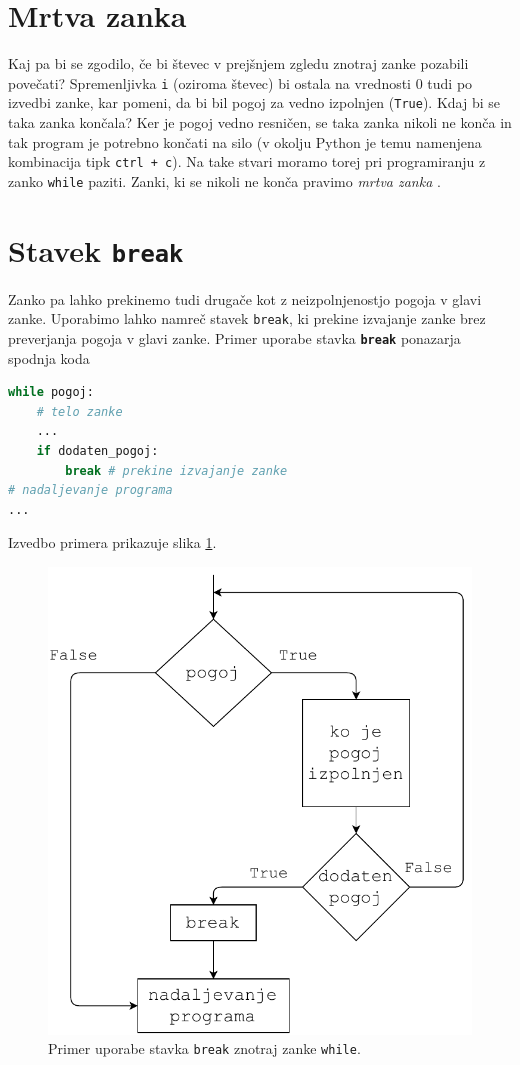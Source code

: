 \section{Mrtva zanka}

Kaj pa bi se zgodilo, če bi števec v prejšnjem zgledu znotraj zanke pozabili povečati? Spremenljivka \texttt{i} (oziroma števec) bi ostala na vrednosti 0 tudi po izvedbi zanke, kar pomeni, da bi bil pogoj za vedno izpolnjen (\texttt{True}). Kdaj bi se taka zanka končala? Ker je pogoj vedno resničen, se taka zanka nikoli ne konča in tak program je potrebno končati na silo (v okolju Python je temu namenjena kombinacija tipk \texttt{ctrl + c}). Na take stvari moramo torej pri programiranju z zanko \texttt{while} paziti. Zanki, ki se nikoli ne konča pravimo \emph{mrtva zanka} .

\section{Stavek \texttt{break}}
Zanko pa lahko prekinemo tudi drugače kot z neizpolnjenostjo pogoja v glavi zanke. Uporabimo lahko namreč stavek \texttt{break}, ki prekine izvajanje zanke brez preverjanja pogoja v glavi zanke. Primer uporabe stavka \texttt\textbf{break} ponazarja spodnja koda
\begin{lstlisting}[language=Python]
while pogoj:
    # telo zanke
    ...
    if dodaten_pogoj: 
        break # prekine izvajanje zanke
# nadaljevanje programa
...
\end{lstlisting}
Izvedbo primera prikazuje slika \ref{img:while2}. 
\begin{figure}
    \centering
    \includegraphics[width=0.5\linewidth]{img/while2.pdf}
    \caption{Primer uporabe stavka \texttt{break} znotraj zanke \texttt{while}.}
    \label{img:while2}
\end{figure}

